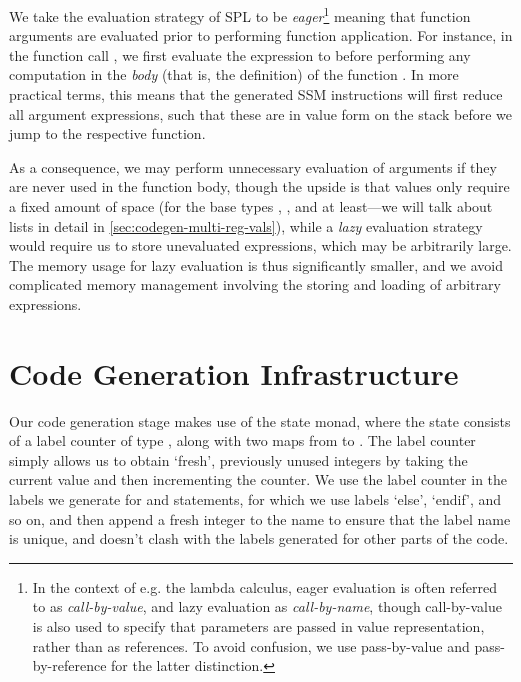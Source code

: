 We take the evaluation strategy of SPL to be \emph{eager}\kern1pt\footnote{In the context
of e.g. the lambda calculus, eager evaluation is often referred to as \emph{call-by-value}, and
lazy evaluation as \emph{call-by-name}, though call-by-value is also used to
specify that parameters are passed in value representation, rather than as references. To avoid
confusion, we use pass-by-value and pass-by-reference for the latter distinction.}
meaning that function arguments are evaluated prior to performing function
application. For instance, in the function call , we first evaluate
the expression  to  before performing any computation in the
\emph{body} (that is, the definition) of the function .
In more practical terms, this means that the generated SSM instructions will
first reduce all argument expressions, such that these are in value form on the
stack before we jump to the respective function.

As a consequence, we may perform unnecessary evaluation of arguments if they are
never used in the function body, though the upside is that values only require
a fixed amount of space (for the base types , , and
 at least---we will talk about lists in detail in
\cref{sec:codegen-multi-reg-vals}), while a \emph{lazy} evaluation strategy
would require us to store unevaluated expressions, which may be arbitrarily
large. The memory usage for lazy evaluation is thus significantly smaller, and
we avoid complicated memory management involving the storing and loading of
arbitrary expressions.



\section{Code Generation Infrastructure} \label{sec:codegen-monad}

Our code generation stage makes use of the state monad, where the state consists
of a label counter of type , along with two maps from
 to .
The label counter simply allows us to obtain `fresh', previously unused integers
by taking the current value and then incrementing the counter. We use the label
counter in the labels we generate for  and  statements, for
which we use labels `else', `endif', and so on, and then append a fresh integer
to the name to ensure that the label name is unique, and doesn't clash with the
labels generated for other parts of the code.

